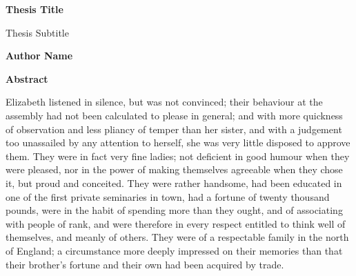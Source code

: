 \thispagestyle{plain}
\begin{center}
    \Large
    \textbf{Thesis Title}
        
    \vspace{0.4cm}
    \large
    Thesis Subtitle
        
    \vspace{0.4cm}
    \textbf{Author Name}
       
    \vspace{0.9cm}
    \textbf{Abstract}
\end{center}
Elizabeth listened in silence, but was not convinced; their
behaviour at the assembly had not been calculated to please in
general; and with more quickness of observation and less pliancy
of temper than her sister, and with a judgement too unassailed by
any attention to herself, she was very little disposed to approve
them. They were in fact very fine ladies; not deficient in good
humour when they were pleased, nor in the power of making
themselves agreeable when they chose it, but proud and conceited.
They were rather handsome, had been educated in one of the first
private seminaries in town, had a fortune of twenty thousand
pounds, were in the habit of spending more than they ought, and
of associating with people of rank, and were therefore in every
respect entitled to think well of themselves, and meanly of
others. They were of a respectable family in the north of
England; a circumstance more deeply impressed on their memories
than that their brother’s fortune and their own had been acquired
by trade.